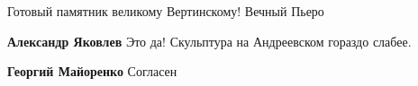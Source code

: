  
 
 
 
 

Готовый памятник великому Вертинскому! Вечный Пьеро

\textbf{Александр Яковлев} Это да! Скульптура на Андреевском гораздо слабее.

\textbf{Георгий Майоренко} Согласен
